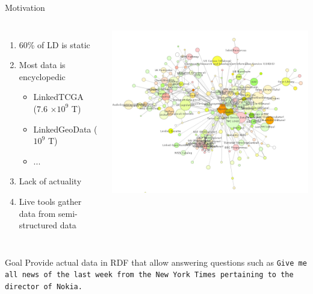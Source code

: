 \documentclass{beamer}
\begin{document}
\begin{frame}{Motivation}
	\begin{columns}[c]
			\centering
			\begin{enumerate}
				\item 60\% of LD is static
				\item Most data is encyclopedic
				\begin{itemize}
					\item LinkedTCGA (7.6 $\times 10^9$ T)
					\item LinkedGeoData ($10^9$ T)
					\item ...
				\end{itemize}
				\item Lack of actuality
				\item Live tools gather data from semi-structured data
			\end{enumerate}
			\centering
			\includegraphics[width=\textwidth]{../images/opendata_graph}
	\end{columns}
\pause
\begin{alertblock}{Goal}
Provide actual data in RDF that allow  answering questions such as 
\texttt{Give me all news of the last week from the New York Times pertaining to the director of Nokia.}
\end{alertblock}

\end{frame}
\end{document}
